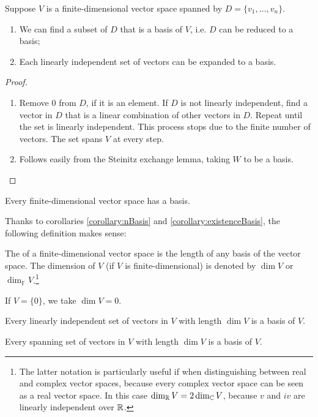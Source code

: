\begin{theorem}
Suppose $V$ is a finite-dimensional vector space spanned by $D = \{v_1, \ldots, v_n\}$.
\begin{enumerate}
\item We can find a subset of $D$ that is a basis of $V$, i.e. $D$ can be reduced to a basis;
\item Each linearly independent set of vectors can be expanded to a basis.
\end{enumerate}
\label{theorem:basis}
\end{theorem}
\begin{proof}
\begin{enumerate}
\item Remove $0$ from $D$, if it is an element. If $D$ is not linearly independent, find a vector in $D$ that is a linear combination of other vectors in $D$. Repeat until the set is linearly independent. This process stops due to the finite number of vectors. The set spans $V$ at every step.
\item Follows easily from the Steinitz exchange lemma, taking $W$ to be a basis.
\end{enumerate}
\end{proof}
\begin{corollary}
Every finite-dimensional vector space has a basis. \label{corollary:existenceBasis}
\end{corollary}

Thanks to corollaries \ref{corollary:nBasis} and \ref{corollary:existenceBasis}, the following definition makes sense:
\begin{definition}
The  of a finite-dimensional vector space is the length of any basis of the vector space.
The dimension of $V$ (if $V$ is finite-dimensional) is denoted by $\dim V$ or $\dim_\mathbb{F}V$.\footnote{The latter notation is particularly useful if when distinguishing between real and complex vector spaces, because every complex vector space can be seen as a real vector space. In this case $\dim_{\mathbb{R}} V = 2\dim_{\mathbb{C}} V$, because $v$ and $iv$ are linearly independent over $\mathbb{R}$.}

If $V = \{0\}$, we take $\dim V = 0$.
\end{definition}

\begin{corollary}
Every linearly independent set of vectors in $V$ with length $\dim V$ is a basis of $V$. \label{corollary:maxLinearlyIndependent}
\end{corollary}
\begin{corollary}
Every spanning set of vectors in $V$ with length $\dim V$ is a basis of $V$.
\end{corollary}

